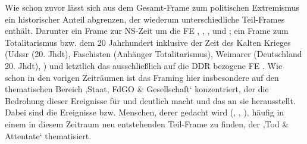 Wie schon zuvor lässt sich aus dem Gesamt-Frame zum politischen Extremismus ein historischer Anteil abgrenzen, der wiederum unterschiedliche Teil-Frames enthält. Darunter ein Frame zur NS-Zeit um die FE , , ,  und ; ein Frame zum Totalitarismus bzw. dem 20 Jahrhundert inklusive der Zeit des Kalten Krieges (Udssr{\breakbar} (20. Jhdt), Faschisten{\breakbar} (Anhänger Totalitarismus), Weimarer (Deutschland 20. Jhdt), ) und letztlich das ausschließlich auf die DDR bezogene FE . Wie schon in den vorigen Zeiträumen ist das Framing hier insbesondere auf den thematischen Bereich ‚Staat, FdGO \& Gesellschaft` konzentriert, der die Bedrohung dieser Ereignisse für  und  deutlich macht und das  an sie herausstellt. Dabei sind die Ereignisse bzw. Menschen, derer gedacht wird (, , ), häufig in einem in diesem Zeitraum neu entstehenden Teil-Frame zu finden, der ‚Tod \& Attentate` thematisiert.\largerpage


